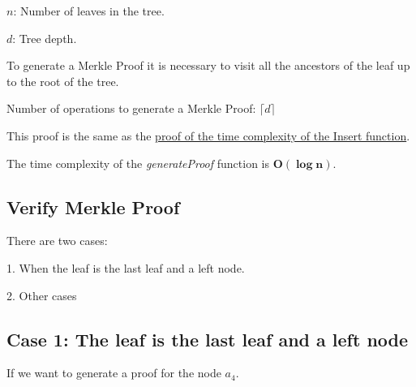 \documentclass{article}
\begin{document}
\bigbreak

$n$: Number of leaves in the tree.

$d$: Tree depth.

\bigbreak

To generate a Merkle Proof it is necessary to visit all the ancestors of the leaf up to the root of the tree.

\bigbreak

Number of operations to generate a Merkle Proof: $\lceil d \rceil$

This proof is the same as the \hyperref[InsertProof]{proof of the time complexity of the Insert function}.

The time complexity of the \textit{generateProof} function is $\boldsymbol{O(\log n)}$.

\bigbreak

\subsection{Verify Merkle Proof}

There are two cases:

1. When the leaf is the last leaf and a left node.

2. Other cases

\bigbreak

\subsection*{Case 1: The leaf is the last leaf and a left node}

\bigbreak

If we want to generate a proof for the node $a_4$.

\bigbreak
\end{document}
